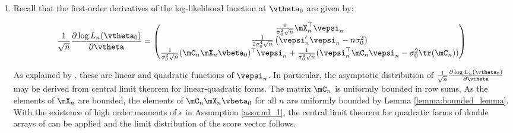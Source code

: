 \documentclass[english,12pt]{book}\usepackage[]{graphicx}\usepackage[]{xcolor}
\begin{document}
\begin{subappendices}
\begin{enumerate}
   
   
   \item Recall that the first-order derivatives of the log-likelihood function at $\vtheta_0$ are given by:
   
  \begin{equation*}
   \frac{1}{\sqrt{n}}\frac{\partial \log L_n(\vtheta_0)}{\partial \vtheta} = \begin{pmatrix}
   \frac{1}{\sigma^2_0\sqrt{n}}\mX_n^\top\vepsi_n\\
   \frac{1}{2\sigma_0^4\sqrt{n}}\left(\vepsi_n'\vepsi_n - n\sigma_0^2\right) \\
   \frac{1}{\sigma_0^2\sqrt{n}}(\mC_n\mX_n\vbeta_0)^\top \vepsi_n + \frac{1}{\sigma_0^2\sqrt{n}}(\vepsi_n^\top\mC_n\vepsi_n - \sigma_0^2\tr(\mC_n))
   \end{pmatrix}
  \end{equation*}


As explained by \citet[][pag. 1905]{lee2004asymptotic}, these are linear and quadratic functions of $\vepsi_n$. In particular, the asymptotic distribution of $\frac{1}{\sqrt{n}}\frac{\partial \log L_n(\vtheta_0)}{\partial \vtheta}$ may be derived from central limit theorem for linear-quadratic forms. The matrix $\mC_n$ is uniformly bounded in row sums. As the elements of $\mX_n$ are bounded, the elements of $\mC_n\mX_n\vbeta_0$ for all $n$ are uniformly bounded by Lemma \ref{lemma:bounded_lemma}. With the existence of high order moments of $\epsilon$ in Assumption \ref{assu:ml_1}, the central limit theorem for quadratic forms of double arrays of \cite{kelejian2001asymptotic} can be applied and the limit distribution of the score vector follows.
\end{enumerate}

\end{subappendices}
\end{document}
